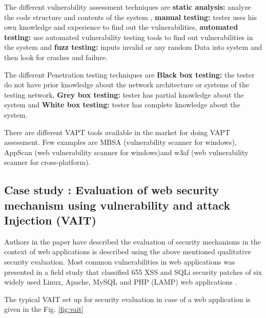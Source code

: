 \documentclass[pdftex,english,oribibl]{llncs}
\begin{document}
The different vulnerability assessment techniques are \textbf{static analysis:} analyze the code structure and contents of the system , \textbf{manual testing:} tester uses his own knowledge and experience to find out the vulnerabilities, \textbf{automated testing:} use automated vulnerability testing tools to find out vulnerabilities in the system and \textbf{fuzz testing:} inputs invalid or any random Data into system and then look for crashes and failure.

The different Penetration testing techniques are \textbf{Black box testing:} the tester do not have prior knowledge about the network architecture or systems of the testing network, \textbf{Grey box testing:} tester has partial knowledge about the system and \textbf{White box testing:} tester has complete knowledge about the system.

There are different VAPT tools available in the market for doing VAPT assessment. Few examples are MBSA (vulnerability scanner for windows), AppScan (web vulnerability scanner for windows)and w3af (web vulnerability scanner for cross-platform).

\subsection{Case study : Evaluation of web security mechanism using vulnerability and attack Injection (VAIT)}
Authors in the paper \cite{6629992_Fronseca} have described the evaluation of security mechanisms in the context of web applications is described using the above mentioned qualitative security evaluation. Most common vulnerabilities in web applications was presented in a field study that classified 655 XSS and SQLi security patches of six widely used Linux, Apache, MySQL and PHP (LAMP) web applications . 

The typical VAIT set up for security evaluation in case of a web application is given in the Fig. \ref{fig:vait}
\end{document}
